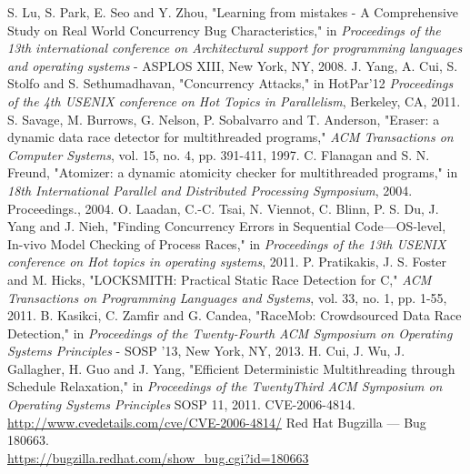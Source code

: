 \documentclass[12pt,conference]{IEEEtran}
\begin{document}

\begin{thebibliography}{10}
S. Lu, S. Park, E. Seo and Y. Zhou, "Learning from mistakes - A Comprehensive Study on Real World Concurrency Bug Characteristics," in \emph{Proceedings of the 13th international conference on Architectural support for programming languages and operating systems} - ASPLOS XIII, New York, NY, 2008.
J. Yang, A. Cui, S. Stolfo and S. Sethumadhavan, "Concurrency Attacks," in HotPar'12 \emph{Proceedings of the 4th USENIX conference on Hot Topics in Parallelism}, Berkeley, CA, 2011.
S. Savage, M. Burrows, G. Nelson, P. Sobalvarro and T. Anderson, "Eraser: a dynamic data race detector for multithreaded programs," \emph{ACM Transactions on Computer Systems}, vol. 15, no. 4, pp. 391-411, 1997.
C. Flanagan and S. N. Freund, "Atomizer: a dynamic atomicity checker for multithreaded programs," in \emph{18th International Parallel and Distributed Processing Symposium}, 2004. Proceedings., 2004.
O. Laadan, C.-C. Tsai, N. Viennot, C. Blinn, P. S. Du, J. Yang and J. Nieh, "Finding Concurrency Errors in Sequential Code—OS-level, In-vivo Model Checking of Process Races," in \emph{Proceedings of the 13th USENIX conference on Hot topics in operating systems}, 2011.
P. Pratikakis, J. S. Foster and M. Hicks, "LOCKSMITH: Practical Static Race Detection for C," \emph{ACM Transactions on Programming Languages and Systems}, vol. 33, no. 1, pp. 1-55, 2011.
B. Kasikci, C. Zamfir and G. Candea, "RaceMob: Crowdsourced Data Race Detection," in \emph{Proceedings of the Twenty-Fourth ACM Symposium on Operating Systems Principles} - SOSP '13, New York, NY, 2013.
H. Cui, J. Wu, J. Gallagher, H. Guo and J. Yang, "Efficient Deterministic Multithreading through Schedule Relaxation," in \emph{Proceedings of the TwentyThird ACM Symposium on Operating Systems Principles} SOSP 11, 2011.
CVE-2006-4814. \url{http://www.cvedetails.com/cve/CVE-2006-4814/}
Red Hat Bugzilla --- Bug 180663.\\\url{https://bugzilla.redhat.com/show_bug.cgi?id=180663}
\end{thebibliography}
\end{document}
